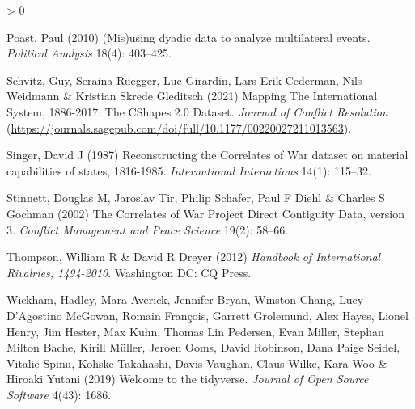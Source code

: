 \documentclass[
  11pt,
]{article}
\newlength{\cslhangindent}
\newenvironment{CSLReferences}[2] %
 {%
  \setlength{\parindent}{0pt}
  \ifodd #1 \everypar{\setlength{\hangindent}{\cslhangindent}}\ignorespaces\fi
  \ifnum #2 > 0
  \setlength{\parskip}{#2\baselineskip}
  \fi
 }%
 {}
\begin{document}
\begin{CSLReferences}{1}{0}
\leavevmode\hypertarget{ref-poast2010mdd}{}%
Poast, Paul (2010) (Mis)using dyadic data to analyze multilateral events. \emph{Political Analysis} 18(4): 403--425.

\leavevmode\hypertarget{ref-schvitz2021mis}{}%
Schvitz, Guy, Seraina Rüegger, Luc Girardin, Lars-Erik Cederman, Nils Weidmann \& Kristian Skrede Gleditsch (2021) {Mapping The International System, 1886-2017: The {CS}hapes 2.0 Dataset}. \emph{Journal of Conflict Resolution} (\url{https://journals.sagepub.com/doi/full/10.1177/00220027211013563}).

\leavevmode\hypertarget{ref-singer1987rcwd}{}%
Singer, David J (1987) Reconstructing the {C}orrelates of {W}ar dataset on material capabilities of states, 1816-1985. \emph{International Interactions} 14(1): 115--32.

\leavevmode\hypertarget{ref-stinnettetal2002cow}{}%
Stinnett, Douglas M, Jaroslav Tir, Philip Schafer, Paul F Diehl \& Charles S Gochman (2002) The {C}orrelates of {W}ar {P}roject {D}irect {C}ontiguity {D}ata, version 3. \emph{Conflict Management and Peace Science} 19(2): 58--66.

\leavevmode\hypertarget{ref-thompsondreyer2012hir}{}%
Thompson, William R \& David R Dreyer (2012) \emph{Handbook of International Rivalries, 1494-2010}. Washington DC: CQ Press.

\leavevmode\hypertarget{ref-wickhametal2019wt}{}%
Wickham, Hadley, Mara Averick, Jennifer Bryan, Winston Chang, Lucy D'Agostino McGowan, Romain François, Garrett Grolemund, Alex Hayes, Lionel Henry, Jim Hester, Max Kuhn, Thomas Lin Pedersen, Evan Miller, Stephan Milton Bache, Kirill Müller, Jeroen Ooms, David Robinson, Dana Paige Seidel, Vitalie Spinu, Kohske Takahashi, Davis Vaughan, Claus Wilke, Kara Woo \& Hiroaki Yutani (2019) Welcome to the {tidyverse}. \emph{Journal of Open Source Software} 4(43): 1686.

\end{CSLReferences}
\end{document}
